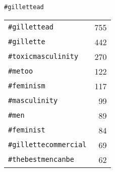 \centering
\captionsetup{justification=centering,singlelinecheck=off}
\caption{
  \texttt{\#gillettead}
}
\begin{tabular}{lr}

\texttt{\#gillettead}         & 755 \\
\texttt{\#gillette}           & 442 \\
\texttt{\#toxicmasculinity}   & 270 \\
\texttt{\#metoo}              & 122 \\
\texttt{\#feminism}           & 117 \\
\texttt{\#masculinity}        & 99 \\
\texttt{\#men}                & 89 \\
\texttt{\#feminist}           & 84 \\
\texttt{\#gillettecommercial} & 69 \\
\texttt{\#thebestmencanbe}    & 62

\end{tabular}
